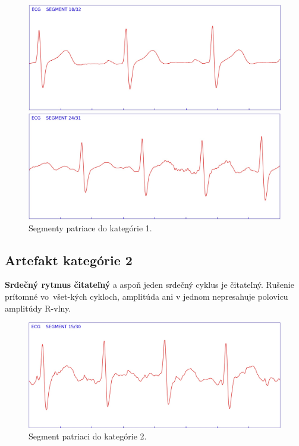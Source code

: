 \begin{figure}[H]
    \centering    
    \includegraphics[scale=0.25]{img/artefact_1.jpeg}
    \par \vspace{0.25cm}
    \includegraphics[scale=0.25]{img/artefact_1_1.jpeg}
    \caption{Segmenty patriace do kategórie 1.}
    \label{fig:artefact_1}
\end{figure}

\newpage

\subsection{Artefakt kategórie 2}

\textbf{Srdečný rytmus čitateľný} a aspoň jeden srdečný cyklus je čitateľný. Rušenie prítomné vo~všet-kých cykloch, amplitúda ani v jednom nepresahuje polovicu amplitúdy R-vlny.

\begin{figure}[H]
    \centering    
    \includegraphics[scale=0.25]{img/artefact_2.jpeg}
    \caption{Segment patriaci do kategórie 2.}
    \label{fig:artefact_2}
\end{figure}

